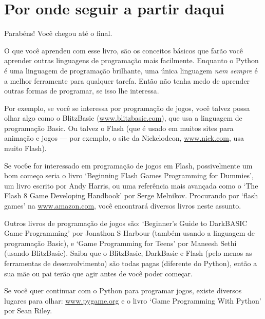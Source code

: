 

\chapter{Por onde seguir a partir daqui}

Parabéns! Você chegou até o final.
\par
O que você aprendeu com esse livro, são os conceitos básicos que farão você aprender outras linguagens de programação mais facilmente. Enquanto o Python é uma linguagem de programação brilhante, uma única linguagem \emph{nem sempre} é a melhor ferramente para qualquer tarefa. Então não tenha medo de aprender outras formas de programar, se isso lhe interessa.

Por exemplo, se você se interessa por programação de jogos, você talvez possa olhar algo como o BlitzBasic (\href{http://www.blitzbasic.com}{www.blitzbasic.com}), que usa a linguagem de programação Basic. Ou talvez o Flash (que é usado em muitos sites para animação e jogos --- por exemplo, o site da Nickelodeon, \href{http://www.nick.com}{www.nick.com}, usa muito Flash).

Se voc6e for interessado em programação de jogos em Flash, possivelmente um bom começo seria o livro `Beginning Flash Games Programming for Dummies', um livro escrito por Andy Harris, ou uma referência mais avançada como o `The Flash 8 Game Developing Handbook' por Serge Melnikov. Procurando por `flash games' na \href{http://www.amazon.com}{www.amazon.com}, você encontrará diversos livros neste assunto.

Outros livros de programação de jogos são: `Beginner's Guide to DarkBASIC Game Programming' por Jonathon S Harbour (também usando a linguagem de programação Basic), e `Game Programming for Teens' por Maneesh Sethi (usando BlitzBasic). Saiba que o BlitzBasic, DarkBasic e Flash (pelo menos as ferramentas de desenvolvimento) são todas pagas (diferente do Python), então a sua mãe ou pai terão que agir antes de você poder começar.

Se você quer continuar com o Python para programar jogos, existe diversos lugares para olhar: \href{http://www.pygame.org}{www.pygame.org} e o livro `Game Programming With Python' por Sean Riley.

